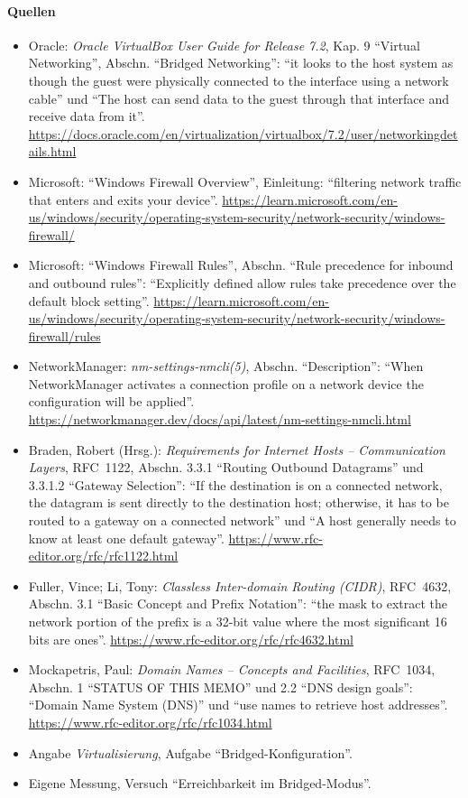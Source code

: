 \paragraph{Quellen}
\begin{itemize}[quellen]
  \item Oracle: \emph{Oracle VirtualBox User Guide for Release 7.2}, Kap. 9 \enquote{Virtual Networking}, Abschn. \enquote{Bridged Networking}: \enquote{it looks to the host system as though the guest were physically connected to the interface using a network cable} und \enquote{The host can send data to the guest through that interface and receive data from it}. \url{https://docs.oracle.com/en/virtualization/virtualbox/7.2/user/networkingdetails.html}
  \item Microsoft: \enquote{Windows Firewall Overview}, Einleitung: \enquote{filtering network traffic that enters and exits your device}. \url{https://learn.microsoft.com/en-us/windows/security/operating-system-security/network-security/windows-firewall/}
  \item Microsoft: \enquote{Windows Firewall Rules}, Abschn. \enquote{Rule precedence for inbound and outbound rules}: \enquote{Explicitly defined allow rules take precedence over the default block setting}. \url{https://learn.microsoft.com/en-us/windows/security/operating-system-security/network-security/windows-firewall/rules}
  \item NetworkManager: \emph{nm-settings-nmcli(5)}, Abschn. \enquote{Description}: \enquote{When NetworkManager activates a connection profile on a network device the configuration will be applied}. \url{https://networkmanager.dev/docs/api/latest/nm-settings-nmcli.html}
  \item Braden, Robert (Hrsg.): \emph{Requirements for Internet Hosts -- Communication Layers}, RFC~1122, Abschn. 3.3.1 \enquote{Routing Outbound Datagrams} und 3.3.1.2 \enquote{Gateway Selection}: \enquote{If the destination is on a connected network, the datagram is sent directly to the destination host; otherwise, it has to be routed to a gateway on a connected network} und \enquote{A host generally needs to know at least one default gateway}. \url{https://www.rfc-editor.org/rfc/rfc1122.html}
  \item Fuller, Vince; Li, Tony: \emph{Classless Inter-domain Routing (CIDR)}, RFC~4632, Abschn. 3.1 \enquote{Basic Concept and Prefix Notation}: \enquote{the mask to extract the network portion of the prefix is a 32-bit value where the most significant 16 bits are ones}. \url{https://www.rfc-editor.org/rfc/rfc4632.html}
  \item Mockapetris, Paul: \emph{Domain Names -- Concepts and Facilities}, RFC~1034, Abschn. 1 \enquote{STATUS OF THIS MEMO} und 2.2 \enquote{DNS design goals}: \enquote{Domain Name System (DNS)} und \enquote{use names to retrieve host addresses}. \url{https://www.rfc-editor.org/rfc/rfc1034.html}
  \item Angabe \emph{Virtualisierung}, Aufgabe \enquote{Bridged-Konfiguration}.
  \item Eigene Messung, Versuch \enquote{Erreichbarkeit im Bridged-Modus}.
\end{itemize}
